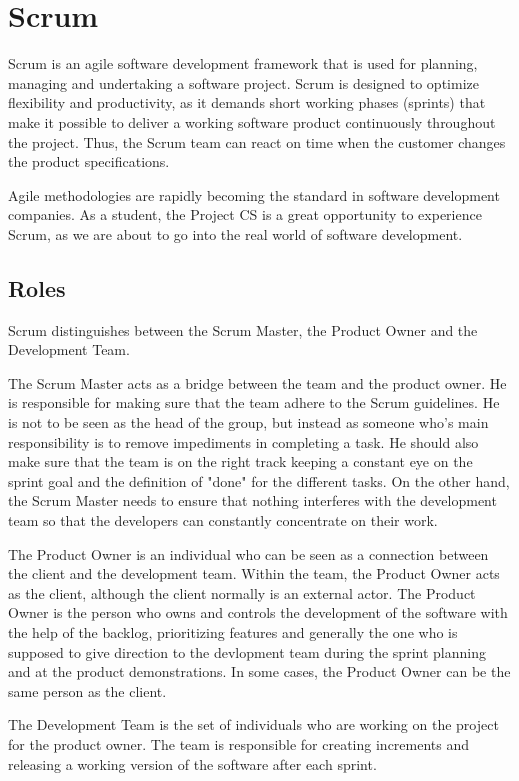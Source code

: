 \section{Scrum}
\label{sec:scrum}
Scrum is an agile software development framework that is used for planning, managing
and undertaking a software project. Scrum is designed to optimize flexibility and productivity,
as it demands short working phases (sprints) that make it possible to deliver
a working software product continuously throughout the project. Thus, the Scrum team
can react on time when the customer changes the product specifications.

Agile methodologies are rapidly becoming the standard
in software development companies. As a student, the Project CS is a great opportunity
to experience Scrum, as we are about to go into the real world of software development.

\subsection{Roles}

Scrum distinguishes between the Scrum Master, the Product Owner and the Development Team.

The Scrum Master acts as a bridge between the team and the product owner. 
He is responsible for making sure that the team adhere to the Scrum guidelines. He is not to be seen as the head of the group, but instead as someone who's main responsibility is to remove impediments in completing a task.
He should also make sure that the team is on the right track keeping a constant eye on the sprint goal
and the definition of "done" for the different tasks. On the other hand, the Scrum Master
needs to ensure that nothing interferes with the development team so that the developers
can constantly concentrate on their work.

The Product Owner is an individual who can be seen as a connection between the client and
the development team. Within the team, the Product Owner acts as the client, although the client normally is an external actor.
The Product Owner is the person who owns and controls the development of the software with the help of the backlog,
prioritizing features and generally the one who is supposed to give direction to the devlopment team during the sprint planning and at the product demonstrations.
In some cases, the Product Owner can be the same person as the client.

The Development Team is the set of individuals who are working on the project for the product owner.
The team is responsible for creating increments and releasing a working version of the software
after each sprint.


